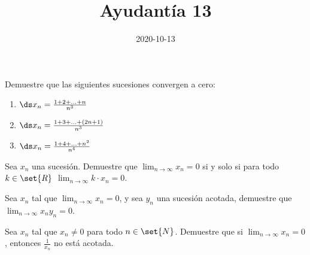 \documentclass{ayudantia}
\title{Ayudantía 13}
\date{2020-10-13}
\begin{document}
\maketitle


\begin{prob}
    Demuestre que las siguientes sucesiones convergen a cero:
    \begin{enumerate}
        \item \(\ds x_n=\frac{1+2+\ldots+n}{n^3}\)
        \item \(\ds x_n=\frac{1+3+\ldots+(2n+1)}{n^3}\)
        \item \(\ds x_n=\frac{1+4+\ldots+n^2}{n^4}\)
    \end{enumerate}
\end{prob}

\begin{ans}
    \begin{sol}

    \end{sol}
\end{ans}



\begin{prob}
    Sea \(x_n\) una sucesión. Demuestre que \(\lim_{n\rightarrow\infty}x_n=0\) si y solo si para todo \(k\in\set{R}\) \(\lim_{n\rightarrow\infty}k\cdot x_n=0\).
\end{prob}

\begin{ans}
    \begin{sol}

    \end{sol}
\end{ans}



\begin{prob}
    Sea \(x_n\) tal que \(\lim_{n\rightarrow\infty}x_n=0\), y sea \(y_n\) una sucesión acotada, demuestre que \(\lim_{n\rightarrow\infty}x_ny_n=0\).
\end{prob}

\begin{ans}
    \begin{sol}

    \end{sol}
\end{ans}



\begin{prob}
    Sea \(x_n\) tal que \(x_n\neq0\) para todo \(n\in\set{N}\). Demuestre que si \(\lim_{n\rightarrow\infty}x_n=0\), entonces \(\frac1{x_n}\) no está acotada.
\end{prob}
\end{document}
